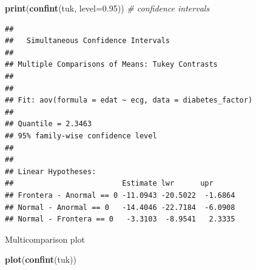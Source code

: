 \documentclass[
  ignorenonframetext,
]{beamer}
\newenvironment{Shaded}{\begin{snugshade}}{\end{snugshade}}
\newcommand{\CommentTok}[1]{\textcolor[rgb]{0.56,0.35,0.01}{\textit{#1}}}
\newcommand{\DataTypeTok}[1]{\textcolor[rgb]{0.13,0.29,0.53}{#1}}
\newcommand{\FloatTok}[1]{\textcolor[rgb]{0.00,0.00,0.81}{#1}}
\newcommand{\KeywordTok}[1]{\textcolor[rgb]{0.13,0.29,0.53}{\textbf{#1}}}
\newcommand{\NormalTok}[1]{#1}
\begin{document}
\begin{frame}[fragile]

\tiny

\begin{Shaded}
\begin{Highlighting}[]
  \KeywordTok{print}\NormalTok{(}\KeywordTok{confint}\NormalTok{(tuk, }\DataTypeTok{level=}\FloatTok{0.95}\NormalTok{)) }\CommentTok{# confidence intervals}
\end{Highlighting}
\end{Shaded}

\begin{verbatim}
## 
##   Simultaneous Confidence Intervals
## 
## Multiple Comparisons of Means: Tukey Contrasts
## 
## 
## Fit: aov(formula = edat ~ ecg, data = diabetes_factor)
## 
## Quantile = 2.3463
## 95% family-wise confidence level
##  
## 
## Linear Hypotheses:
##                         Estimate lwr      upr     
## Frontera - Anormal == 0 -11.0943 -20.5022  -1.6864
## Normal - Anormal == 0   -14.4046 -22.7184  -6.0908
## Normal - Frontera == 0   -3.3103  -8.9541   2.3335
\end{verbatim}

\end{frame}

\begin{frame}[fragile]{Multicomparison plot}
\protect\hypertarget{multicomparison-plot}{}

\small

\begin{Shaded}
\begin{Highlighting}[]
  \KeywordTok{plot}\NormalTok{(}\KeywordTok{confint}\NormalTok{(tuk))}
\end{Highlighting}
\end{Shaded}

\end{frame}
\end{document}
